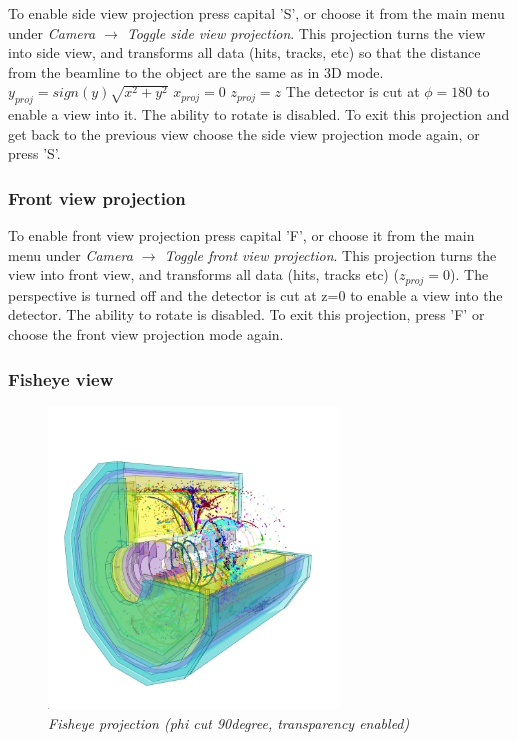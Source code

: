 \documentclass[a4paper,10pt]{article}
\begin{document}
To enable side view projection press capital 'S', or choose it from the main menu under \textit{Camera $\to$ Toggle side view projection}. 
This projection turns the view into side view, and transforms all data (hits, tracks, etc) so that the distance from the beamline to the object are the same as in 3D mode.
\newline\newline
$y_{proj} = sign(y) \sqrt{x^2 + y^2}$\newline
$x_{proj}=0$\newline
$z_{proj} = z$ \newline
\newline
The detector is cut at $\phi=180$ to enable a view into it. The ability to rotate is  disabled. 
To exit this projection and get back to the previous view choose the side view projection mode again, or press 'S'. 




\subsubsection{Front view projection}
To enable front view projection press capital 'F', or choose it from the main menu under 
\textit{Camera $\to$ Toggle front view projection}.
This projection turns the view into front view, and transforms all data (hits, tracks etc)
($z_{proj} = 0$). The perspective is turned off and the detector is cut at z=0 to enable a view into the detector. The ability to rotate is disabled. To exit this projection, press 'F' or choose the front view projection mode again. 


\subsubsection{Fisheye view}
\begin{figure}
\centerline{ \includegraphics[height=8cm]{img/fisheye.png}}
\caption{\label{CEDViewer} \textsl{Fisheye projection (phi cut 90degree, transparency enabled)}}
\end{figure}
\end{document}
